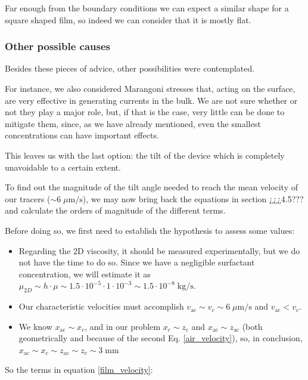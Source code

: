 Far enough from the boundary conditions we can expect a similar shape for a square shaped film, so indeed we can consider that it is mostly flat.

\subsubsection{Other possible causes}

Besides these pieces of advice, other possibilities were contemplated.

For instance, we also considered Marangoni stresses that, acting on the surface, are very effective in generating currents in the bulk. We are not sure whether or not they play a major role, but, if that is the case, very little can be done to mitigate them, since, as we have already mentioned, even the smallest concentrations can have important effects.

This leaves us with the last option: the tilt of the device which is completely unavoidable to a certain extent.

To find out the magnitude of the tilt angle needed to reach the mean velocity of our tracers ($\sim 6 \; \mu \textrm{m/s}$), we may now bring back the equations in section ¿¿¿4.5??? and calculate the orders of magnitude of the different terms. 

Before doing so, we first need to establish the hypothesis to assess some values:

\begin{itemize}
	\item Regarding the 2D viscosity, it should be measured experimentally, but we do not have the time to do so. Since we have a negligible surfactant concentration, we will estimate it as $\mu_{2D} \sim h \cdot \mu \sim 1.5\cdot 10^{-5} \cdot 1\cdot 10^{-3} \sim 1.5\cdot 10^{-8} \; \textrm{kg/s}$.
	\item Our characteristic velocities must accomplish $ v_{\mathrm{ac}} \sim v_c \sim 6 \; \mu \textrm{m/s}$ and $ v_{\mathrm{ac}} < v_c $.
	\item We know $x_{\mathrm{ac}} \sim x_c$, and in our problem $ x_c \sim z_c $ and $ x_{\mathrm{ac}} \sim z_{\mathrm{ac}} $ (both geometrically and because of the second Eq. \ref{air_velocity}), so, in conclusion, $ x_{\mathrm{ac}} \sim x_c \sim z_{\mathrm{ac}} \sim z_c \sim 3 \; \textrm{mm}$
	
\end{itemize}

So the terms in equation \ref{film_velocity}:

